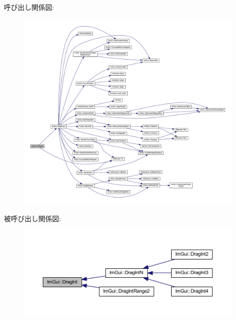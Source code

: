 呼び出し関係図\+:\nopagebreak
\begin{figure}[H]
\begin{center}
\leavevmode
\includegraphics[width=350pt]{namespace_im_gui_abc3ac739a79de5897b61df4e6764fc9e_cgraph}
\end{center}
\end{figure}
被呼び出し関係図\+:\nopagebreak
\begin{figure}[H]
\begin{center}
\leavevmode
\includegraphics[width=350pt]{namespace_im_gui_abc3ac739a79de5897b61df4e6764fc9e_icgraph}
\end{center}
\end{figure}
\mbox{\label{namespace_im_gui_aa74f28deeb62f0aa96e1c34b27e7bcd9}} 
